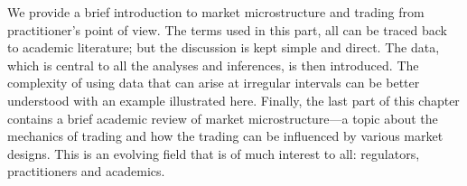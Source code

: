 
We provide a brief introduction to market microstructure and trading from practitioner's point of view. The terms used in this part, all can be traced back to academic literature; but the discussion is kept simple and direct. The data, which is central to all the analyses and inferences, is then introduced. The complexity of using data that can arise at irregular intervals can be better understood with an example illustrated here. Finally, the last part of this chapter contains a brief academic review of market microstructure---a topic about the mechanics of trading and how the trading can be influenced by various market designs. This is an evolving field that is of much interest to all: regulators, practitioners and academics. 